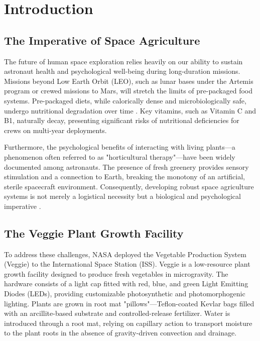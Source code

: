\chapter{Introduction}
\label{ch:introduction}

\section{The Imperative of Space Agriculture}
The future of human space exploration relies heavily on our ability to sustain astronaut health and psychological well-being during long-duration missions. Missions beyond Low Earth Orbit (LEO), such as lunar bases under the Artemis program or crewed missions to Mars, will stretch the limits of pre-packaged food systems. Pre-packaged diets, while calorically dense and microbiologically safe, undergo nutritional degradation over time \cite{wheeler2017}. Key vitamins, such as Vitamin C and B1, naturally decay, presenting significant risks of nutritional deficiencies for crews on multi-year deployments.

Furthermore, the psychological benefits of interacting with living plants---a phenomenon often referred to as "horticultural therapy"---have been widely documented among astronauts. The presence of fresh greenery provides sensory stimulation and a connection to Earth, breaking the monotony of an artificial, sterile spacecraft environment. Consequently, developing robust space agriculture systems is not merely a logistical necessity but a biological and psychological imperative \cite{zabel2016}.

\section{The Veggie Plant Growth Facility}
To address these challenges, NASA deployed the Vegetable Production System (Veggie) to the International Space Station (ISS). Veggie is a low-resource plant growth facility designed to produce fresh vegetables in microgravity. The hardware consists of a light cap fitted with red, blue, and green Light Emitting Diodes (LEDs), providing customizable photosynthetic and photomorphogenic lighting. Plants are grown in root mat "pillows"---Teflon-coated Kevlar bags filled with an arcillite-based substrate and controlled-release fertilizer. Water is introduced through a root mat, relying on capillary action to transport moisture to the plant roots in the absence of gravity-driven convection and drainage.

